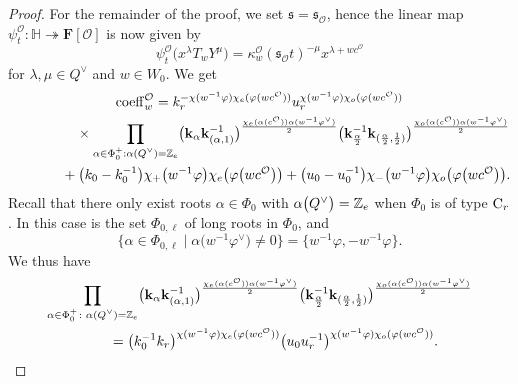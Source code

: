 \begin{proof}
For the remainder of the proof, we set $\mathfrak{s}=\mathfrak{s}_\mathcal{O}$, hence the linear map $\psi_t^\mathcal{O}\colon \mathbb{H}\twoheadrightarrow\mathbf{F}[\mathcal{O}]$ is now given by
\begin{equation}\label{psitO}
\psi_t^\mathcal{O}\bigl(x^\lambda T_wY^\mu\bigr)=\kappa_w^\mathcal{O}(\mathfrak{s}_\mathcal{O}t)^{-\mu}x^{\lambda+wc^\mathcal{O}}
\end{equation}
for $\lambda,\mu\in Q^\vee$ and $w\in W_0$.
We get
\begin{gather}
{\rm coeff}_w^\mathcal{O}=k_r^{-\chi(w^{-1}\varphi)\chi_e(\varphi(wc^\mathcal{O}))}
u_r^{\chi(w^{-1}\varphi)\chi_o(\varphi(wc^\mathcal{O}))}\nonumber\\
\hphantom{{\rm coeff}_w^\mathcal{O}=}\quad{}
 \times\prod_{\alpha\in\Phi_0^+: \alpha\smash{(Q^\vee)}=\mathbb{Z}_e}
\bigl(\mathbf{k}_\alpha \mathbf{k}_{(\alpha,1)}^{-1}\bigr)^{\frac{\chi_e(\alpha(c^\mathcal{O}))\alpha(w^{-1}\varphi^\vee)}{2}} \bigl(\mathbf{k}_{\frac{\alpha}{2}}^{-1}\mathbf{k}_{(\frac{\alpha}{2},\frac{1}{2})}\bigr)^{\frac{\chi_o(\alpha(c^\mathcal{O}))\alpha(w^{-1}\varphi^\vee)}{2}}\nonumber\\
\hphantom{{\rm coeff}_w^\mathcal{O}=}{}
+\bigl(k_0-k_0^{-1}\bigr)\chi_+\bigl(w^{-1}\varphi\bigr)\chi_e\bigl(\varphi\bigl(wc^\mathcal{O}\bigr)\bigr)+
\bigl(u_0-u_0^{-1}\bigr)\chi_-\bigl(w^{-1}\varphi\bigr)\chi_o\bigl(\varphi\bigl(wc^\mathcal{O}\bigr)\bigr).
\label{coeffmid}
\end{gather}
Recall that there only exist roots $\alpha\in\Phi_0$ with $\alpha\smash{\bigl(Q^\vee\bigr)}=\mathbb{Z}_e$ when $\Phi_0$ is of type ${\rm C}_r$. In this case
 is the set $\Phi_{0,\ell}$ of long roots in $\Phi_0$, and
\[
\bigl\{\alpha\in\Phi_{0,\ell} \mid \alpha\bigl(w^{-1}\varphi^\vee\bigr)\not=0\bigr\}=\big\{w^{-1}\varphi,-w^{-1}\varphi\big\}.
\]
We thus have
\begin{gather*}
\prod_{\alpha\in\Phi_0^+\colon \alpha\smash{(Q^\vee)}=\mathbb{Z}_e}
\bigl(\mathbf{k}_\alpha \mathbf{k}_{(\alpha,1)}^{-1}\bigr)^{\frac{\chi_e(\alpha(c^\mathcal{O}))\alpha(w^{-1}\varphi^\vee)}{2}} \bigl(\mathbf{k}_{\frac{\alpha}{2}}^{-1}\mathbf{k}_{(\frac{\alpha}{2},\frac{1}{2})}\bigr)^{\frac{\chi_o(\alpha(c^\mathcal{O}))\alpha(w^{-1}\varphi^\vee)}{2}}\\
\qquad{}=
\bigl(k_0^{-1}k_r\bigr)^{\chi(w^{-1}\varphi)\chi_e(\varphi(wc^\mathcal{O}))}
\bigl(u_0u_r^{-1}\bigr)^{\chi(w^{-1}\varphi)\chi_o(\varphi(wc^\mathcal{O}))}.\label{hhhelp}

\end{gather*}
\end{proof}
